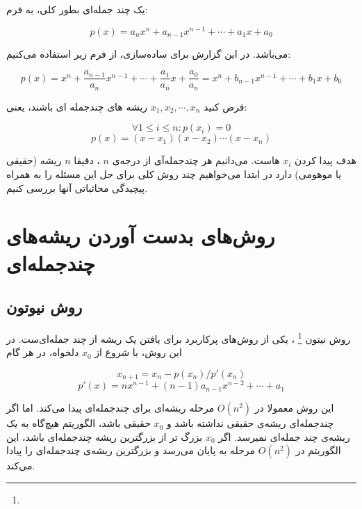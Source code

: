 یک چند جمله‌ای بطور کلی، به فرم:

\begin{equation}
  p(x) = a_n x^n + a_{n-1}x^{n-1} + \cdots + a_1x + a_0
\end{equation}

می‌باشد. در این گزارش برای ساده‌سازی، از فرم زیر استفاده می‌کنیم:

\begin{equation}
  p(x) =  x^n + \frac{a_{n-1}}{a_n} x^{n-1} + \cdots + \frac{a_1}{a_n} x + \frac{a_0}{a_n} = x^n + b_{n-1} x^{n-1} + \cdots + b_1 x + b_0
\end{equation}


فرض کنید
$x_1, x_2, \cdots, x_n$
ریشه های چندجمله ای باشند، یعنی:

\begin{equation}
  \forall 1 \le i \le n : p(x_i) = 0
\end{equation}
\begin{equation}
  p(x) = (x - x_1) (x - x_2) \cdots (x - x_n)
\end{equation}

هدف پیدا کردن
$x_i$
هاست.
می‌دانیم هر چندجمله‌آی از درجه‌ی
$n$
،
دقیقا
$n$
ریشه (حقیقی یا موهومی) دارد
در ابتدا می‌خواهیم چند روش کلی برای حل این مسئله را به همراه پیچیدگی محاثباتی آنها بررسی کنیم.

\section{روش‌های بدست آوردن ریشه‌های چندجمله‌ای}
\subsection{روش نیوتون}
روش
نیتون
\footnote{}
،
یکی از روش‌های پرکاربرد برای یافتن یک ریشه از چند جمله‌ای‌ست.
در این روش، با شروع از
$x_0$
دلخواه، در هر گام

\begin{equation}
  x_{n + 1} = x_n - p(x_n) / p'(x_n)
\end{equation}
\begin{equation}
  p'(x) = n x^{n-1} + (n - 1) a_{n-1} x^{n-2} + \cdots + a_1
\end{equation}

این روش معمولا در
$O(n^2)$
مرحله ریشه‌ای برای چندجمله‌ای پیدا می‌کند.
اما اگر چند‌جمله‌ای ریشه‌ی حقیقی نداشته باشد و
$x_0$
حقیقی باشد، الگوریتم هیچ‌گاه به یک ریشه‌ی چند جمله‌ای نمیرسد.
اگر
$x_0$
بزرگ تر از بزرگترین ریشه چندجمله‌ای باشد، این الگوریتم در
$O(n^2)$
مرحله به پایان می‌رسد
و بزرگترین ریشه‌ی چندجمله‌ای را پیادا می‌کند.

